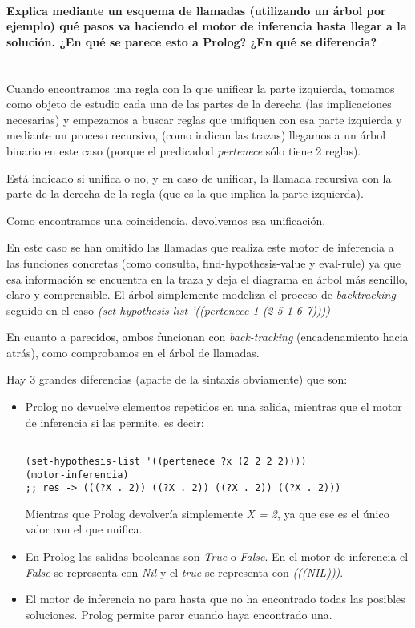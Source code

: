 \documentclass[nochap]{apuntes}
\begin{document}
\paragraph{Explica mediante un esquema de llamadas (utilizando un árbol por ejemplo) qué pasos va haciendo el motor de inferencia hasta llegar a la solución. ¿En qué se parece esto a Prolog? ¿En qué se diferencia?\\\\}

Cuando encontramos una regla con la que unificar la parte izquierda, tomamos como objeto de estudio cada una de las partes de la derecha (las implicaciones necesarias) y empezamos a buscar reglas que unifiquen con esa parte izquierda y mediante un proceso recursivo, (como indican las trazas) llegamos a un árbol binario en este caso (porque el predicadod \textit{pertenece} sólo tiene 2 reglas).

Está indicado si unifica o no, y en caso de unificar, la llamada recursiva con la parte de la derecha de la regla (que es la que implica la parte izquierda).

Como encontramos una coincidencia, devolvemos esa unificación.

En este caso se han omitido las llamadas que realiza este motor de inferencia a las funciones concretas (como consulta, find-hypothesis-value y eval-rule) ya que esa información se encuentra en la traza y deja el diagrama en árbol más sencillo, claro y comprensible. El árbol simplemente modeliza el proceso de \textit{backtracking} seguido en el caso \textit{(set-hypothesis-list '((pertenece 1 (2 5 1 6 7))))}
\newpage
{}

En cuanto a parecidos, ambos funcionan con \textit{back-tracking} (encadenamiento hacia atrás), como comprobamos en el árbol de llamadas.

Hay 3 grandes diferencias (aparte de la sintaxis obviamente) que son:
\begin{itemize}
\item Prolog no devuelve elementos repetidos  en una salida, mientras que el motor de inferencia si las permite, es decir:
\begin{lstlisting}[frame=single]

(set-hypothesis-list '((pertenece ?x (2 2 2 2))))
(motor-inferencia)
;; res -> (((?X . 2)) ((?X . 2)) ((?X . 2)) ((?X . 2)))
\end{lstlisting}
Mientras que Prolog devolvería simplemente \textit{X = 2}, ya que ese es el único valor con el que unifica.
\item En Prolog las salidas booleanas son \textit{True} o \textit{False}. En el motor de inferencia el \textit{False} se representa con \textit{Nil} y el \textit{true} se representa con \textit{(((NIL)))}.
\item El motor de inferencia no para hasta que no ha encontrado todas las posibles soluciones. Prolog permite parar cuando haya encontrado una.
\end{itemize}
\end{document}
